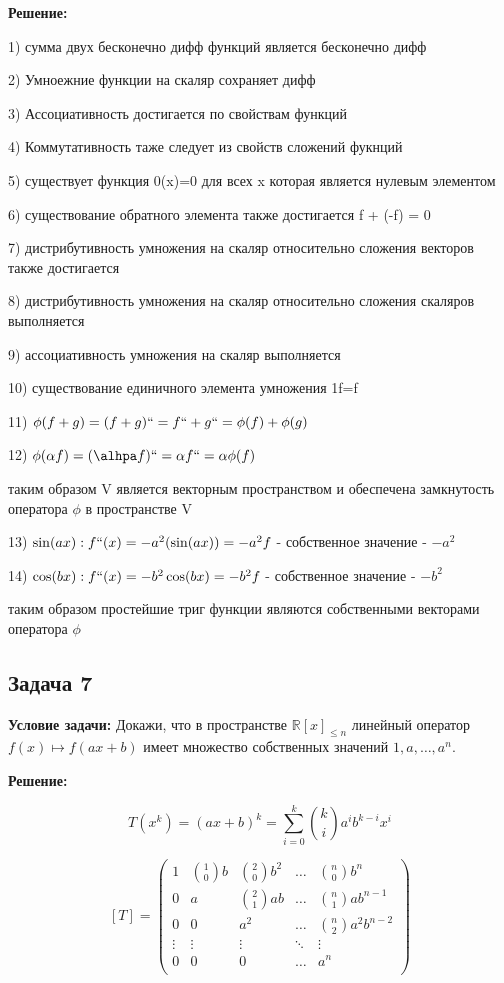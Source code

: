 \documentclass[a4paper,12pt]{article}
\begin{document}
\textbf{Решение: }

1) сумма двух бесконечно дифф функций является бесконечно дифф

2) Умноежние функции на скаляр сохраняет дифф

3) Ассоциативность достигается по свойствам функций

4) Коммутативность таже следует из свойств сложений фукнций

5) существует функция 0(x)=0 для всех x которая является нулевым элементом

6) существование обратного элемента также достигается f + (-f) = 0

7) дистрибутивность умножения на скаляр относительно сложения векторов также достигается

8) дистрибутивность умножения на скаляр относительно сложения скаляров выполняется

9) ассоциативность умножения на скаляр выполняется

10) существование единичного элемента умножения 1f=f 

11) $\phi(f+g) = (f+g)`` = f`` + g`` = \phi(f)+\phi(g)$

12) $\phi(\alpha f) = (\alhpa f)`` = \alpha f`` = \alpha \phi(f)$

таким образом V является векторным пространством и обеспечена замкнутость оператора $\phi$ в пространстве V

13) $\sin(ax): f``(x)=-a^2(\sin(ax))=-a^2f$ - собственное значение - $-a^2$

14) $\cos(bx): f``(x)= -b^2\cos(bx) = -b^2f$ - собственное значение  - $-b^2$

таким образом простейшие триг функции являются собственными векторами оператора $\phi$

\subsection{Задача 7}
\textbf{Условие задачи:} Докажи, что в пространстве $\mathbb{R}[x]_{\leq n}$ линейный оператор $f(x) \mapsto f(ax + b)$ имеет множество собственных значений $1, a, \dots, a^n$.

\textbf{Решение: }

\[
T(x^k) = (ax+b)^k = \sum_{i=0}^{k}\binom{k}{i}a^ib^{k-i}x^i
\]

\[
[T] = \begin{pmatrix}
1 & \binom{1}{0} b & \binom{2}{0} b^2 & \dots & \binom{n}{0} b^n \\
0 & a & \binom{2}{1} a b & \dots & \binom{n}{1} a b^{n-1} \\
0 & 0 & a^2 & \dots & \binom{n}{2} a^2 b^{n-2} \\
\vdots & \vdots & \vdots & \ddots & \vdots \\
0 & 0 & 0 & \dots & a^n \\
\end{pmatrix}
\]
\end{document}
